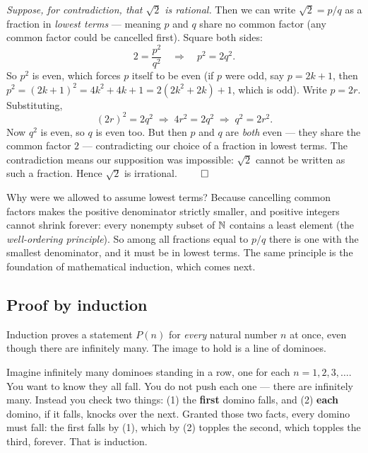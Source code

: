 \begin{example}
\label{ch40:ex-sqrt2}
\emph{Suppose, for contradiction, that $\sqrt 2$ is rational.} Then we can write
$\sqrt 2 = p/q$ as a fraction in \emph{lowest terms} --- meaning $p$ and $q$ share
no common factor (any common factor could be cancelled first). Square both sides:
\[
  2 = \frac{p^2}{q^2} \quad\Longrightarrow\quad p^2 = 2q^2.
\]
So $p^2$ is even, which forces $p$ itself to be even (if $p$ were odd, say $p = 2k+1$,
then $p^2 = (2k+1)^2 = 4k^2 + 4k + 1 = 2(2k^2+2k)+1$, which is odd). Write $p = 2r$.
Substituting,
\[
  (2r)^2 = 2q^2 \;\Longrightarrow\; 4r^2 = 2q^2 \;\Longrightarrow\; q^2 = 2r^2.
\]
Now $q^2$ is even, so $q$ is even too. But then $p$ and $q$ are \emph{both} even
--- they share the common factor $2$ --- contradicting our choice of a fraction in
lowest terms. The contradiction means our supposition was impossible: $\sqrt 2$
cannot be written as such a fraction. Hence $\sqrt 2$ is irrational. $\qed$
\end{example}

\begin{happeningbox}
Why were we allowed to assume lowest terms? Because cancelling common factors
makes the positive denominator strictly smaller, and positive integers cannot
shrink forever: every nonempty subset of $\mathbb{N}$ contains a least element (the
\emph{well-ordering principle}). So among all fractions equal to $p/q$ there is
one with the smallest denominator, and it must be in lowest terms. The same
principle is the foundation of mathematical induction, which comes next.
\end{happeningbox}

\subsection{Proof by induction}

Induction proves a statement $P(n)$ for \emph{every} natural number $n$ at once,
even though there are infinitely many. The image to hold is a line of dominoes.

\begin{intuitionbox}
Imagine infinitely many dominoes standing in a row, one for each $n=1,2,3,\dots$.
You want to know they all fall. You do not push each one --- there are infinitely
many. Instead you check two things: (1) the \textbf{first} domino falls, and
(2) \textbf{each} domino, if it falls, knocks over the next. Granted those two
facts, every domino must fall: the first falls by (1), which by (2) topples the
second, which topples the third, forever. That is induction.
\end{intuitionbox}

